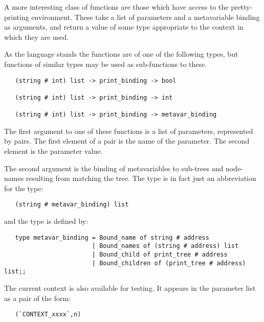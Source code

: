 A more interesting class of functions are those which have access to the
pretty-printing environment. These take a list of parameters and a metavariable
binding as arguments, and return a value of some type appropriate to the
context in which they are used.

As the language stands the functions are of one of the following types, but
functions of similar types may be used as sub-functions to these.

\begin{small}\begin{verbatim}
   (string # int) list -> print_binding -> bool

   (string # int) list -> print_binding -> int

   (string # int) list -> print_binding -> metavar_binding
\end{verbatim}\end{small}

\noindent
The first argument to one of these functions is a list of parameters,
represented by pairs. The first element of a pair is the name of the parameter.
The second element is the parameter value.

The second argument is the binding of metavariables to sub-trees and node-names
resulting from matching the tree. The type  is in fact
just an abbreviation for the type:

\begin{small}\begin{verbatim}
   (string # metavar_binding) list
\end{verbatim}\end{small}

\noindent
and the type  is defined by:

\begin{small}\begin{verbatim}
   type metavar_binding = Bound_name of string # address
                        | Bound_names of (string # address) list
                        | Bound_child of print_tree # address
                        | Bound_children of (print_tree # address) list;;
\end{verbatim}\end{small}

\noindent
The current context is also available for
testing. It appears in the parameter list as a pair of the form:

\begin{small}\begin{verbatim}
   (`CONTEXT_xxxx`,n)
\end{verbatim}\end{small}

